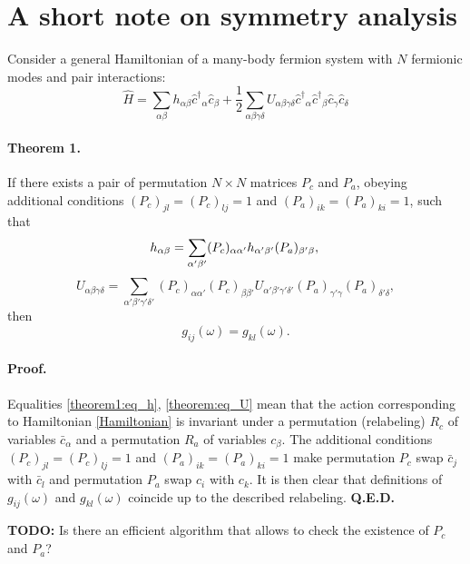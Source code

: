 \documentclass{article}
\newcommand{\bc}{\ensuremath{\bar c}}
\newcommand{\hc}{\ensuremath{\hat c}}
\newcommand{\hcd}{\ensuremath{\hat c^\dagger}}
\begin{document}
\section{A short note on symmetry analysis}

Consider a general Hamiltonian of a many-body fermion system with $N$ fermionic modes and
pair interactions:
\begin{equation}\label{Hamiltonian}
    \hat H = \sum_{\alpha\beta} h_{\alpha\beta}\hcd_\alpha \hc_\beta +
        \frac{1}{2}\sum_{\alpha\beta\gamma\delta} U_{\alpha\beta\gamma\delta}
        \hcd_\alpha \hcd_\beta \hc_\gamma \hc_\delta
\end{equation}

\paragraph{Theorem 1.} If there exists a pair of permutation $N\times N$ matrices $P_c$ and $P_a$,
obeying additional conditions $(P_c)_{jl}=(P_c)_{lj}=1$ and $(P_a)_{ik}=(P_a)_{ki}=1$, such that
\begin{equation}\label{theorem1:eq_h}
    h_{\alpha\beta} = \sum_{\alpha'\beta'}(P_c)_{\alpha\alpha'} h_{\alpha'\beta'} (P_a)_{\beta'\beta},\\
\end{equation}
\begin{equation}\label{theorem:eq_U}
    U_{\alpha\beta\gamma\delta} = \sum_{\alpha'\beta'\gamma'\delta'}
        (P_c)_{\alpha\alpha'}(P_c)_{\beta\beta'}
        U_{\alpha'\beta'\gamma'\delta'}
        (P_a)_{\gamma'\gamma}(P_a)_{\delta'\delta},
\end{equation}
then
\begin{equation}\label{theorem1:result}
    g_{ij}(\omega) = g_{kl}(\omega).
\end{equation}

\paragraph{Proof.} Equalities \ref{theorem1:eq_h}, \ref{theorem:eq_U} mean that the action
corresponding to Hamiltonian \ref{Hamiltonian} is invariant under a permutation (relabeling) $R_c$
of variables $\bc_\alpha$ and a permutation $R_a$ of variables $c_\beta$.
The additional conditions $(P_c)_{jl}=(P_c)_{lj}=1$ and $(P_a)_{ik}=(P_a)_{ki}=1$ make
permutation $P_c$ swap $\bc_j$ with $\bc_l$ and permutation $P_a$ swap $c_i$ with $c_k$.
It is then clear that definitions of $g_{ij}(\omega)$ and $g_{kl}(\omega)$ coincide up
to the described relabeling. \textbf{Q.E.D.}

\vspace{5mm}
\textbf{TODO:} Is there an efficient algorithm that allows to check the existence of $P_c$ and $P_a$?
\end{document}
